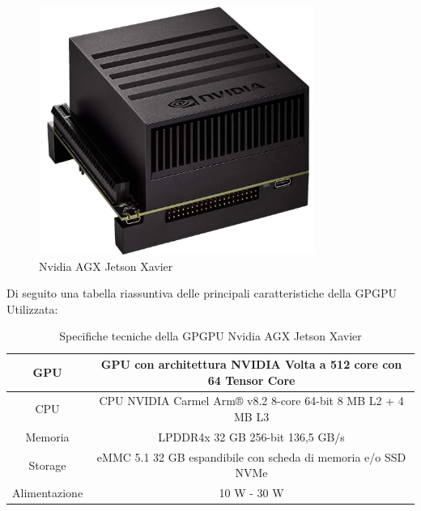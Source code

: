 \begin{figure}[H]
  \centering
  \includegraphics[width=0.8\textwidth]{figures/xavier.jpg}
  \caption{Nvidia AGX Jetson Xavier}
  \label{Nvidia AGX Jetson Xavier}
\end{figure}

\noindent Di seguito una tabella riassuntiva delle principali caratteristiche della GPGPU Utilizzata:

\begin{center}
  \begin{table}[H]
  \centering
    \begin{tabular}{|c|c|}
      \hline 
      GPU& GPU con architettura NVIDIA Volta a 512 core con 64 Tensor Core \\
      \hline 
      CPU& CPU NVIDIA Carmel Arm® v8.2 8-core 64-bit 8 MB L2 + 4 MB L3 \\
      \hline 
      Memoria& LPDDR4x 32 GB 256-bit 136,5 GB/s \\
      \hline
      Storage& eMMC 5.1 32 GB espandibile con scheda di memoria e/o SSD NVMe \\ 
      \hline
      Alimentazione& 10 W - 30 W \\
      \hline
    \end{tabular}
    \caption{Specifiche tecniche della GPGPU Nvidia AGX Jetson Xavier\cite{jetson_xavier}}
  \end{table}
\end{center}


